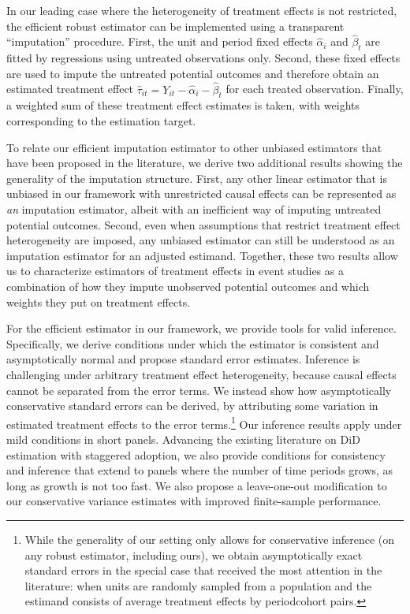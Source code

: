 \documentclass[english,11pt]{article}
\theoremstyle{plain}
\theoremstyle{plain}
\theoremstyle{plain}
\theoremstyle{plain}
\begin{document}
In our leading case where the heterogeneity of treatment effects is
not restricted, the efficient robust estimator can be implemented
using a transparent ``imputation'' procedure. First, the unit and
period fixed effects $\hat{\alpha}_{i}$ and $\hat{\beta}_{t}$ are
fitted by regressions using untreated observations only. Second, these
fixed effects are used to impute the untreated potential outcomes
and therefore obtain an estimated treatment effect $\hat{\tau}_{it}=Y_{it}-\hat{\alpha}_{i}-\hat{\beta}_{t}$
for each treated observation. Finally, a weighted sum of these treatment
effect estimates is taken, with weights corresponding to the estimation
target.

To relate our efficient imputation estimator to other unbiased estimators
that have been proposed in the literature, we derive two additional
results showing the generality of the imputation structure. First,
any other linear estimator that is unbiased in our framework with
unrestricted causal effects can be represented as \emph{an} imputation
estimator, albeit with an inefficient way of imputing untreated potential
outcomes. Second, even when assumptions that restrict treatment effect
heterogeneity are imposed, any unbiased estimator can still be understood
as an imputation estimator for an adjusted estimand. Together, these
two results allow us to characterize estimators of treatment effects
in event studies as a combination of how they impute unobserved potential
outcomes and which weights they put on treatment effects.

For the efficient estimator in our framework, we provide tools for
valid inference. Specifically, we derive conditions under which the
estimator is consistent and asymptotically normal and propose standard
error estimates. Inference is challenging under arbitrary treatment
effect heterogeneity, because causal effects cannot be separated from
the error terms. We instead show how asymptotically conservative standard
errors can be derived, by attributing some variation in estimated
treatment effects to the error terms.\footnote{\label{fn:comparable estimators}While the generality of our setting
only allows for conservative inference (on any robust estimator, including
ours), we obtain asymptotically exact standard errors in the special
case that received the most attention in the literature: when units
are randomly sampled from a population and the estimand consists of
average treatment effects by period\textendash cohort pairs.} Our inference results apply under mild conditions in short panels.
Advancing the existing literature on DiD estimation with staggered
adoption, we also provide conditions for consistency and inference
that extend to panels where the number of time periods grows, as long
as growth is not too fast. We also propose a leave-one-out modification
to our conservative variance estimates with improved finite-sample
performance.
\end{document}

